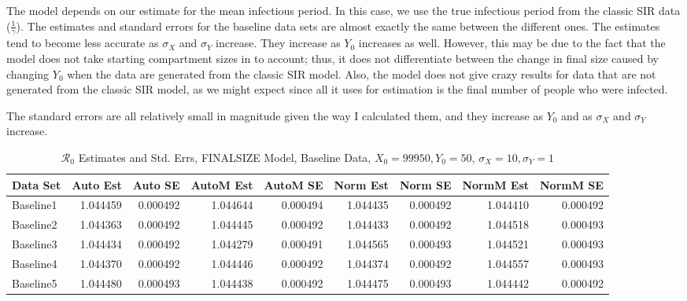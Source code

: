 \documentclass[12pt]{article}
\newcommand{\rr}{\ensuremath{\mathcal{R}_0}}
\begin{document}
The model depends on our estimate for the mean infectious period. In this case, we use the true infectious period from the classic SIR data ($\frac{1}{\gamma}$). The estimates and standard errors for the baseline data sets are almost exactly the same between the different ones. The estimates tend to become less accurate as $\sigma_X$ and $\sigma_Y$ increase. They increase as $Y_0$ increases as well. However, this may be due to the fact that the model does not take starting compartment sizes in to account; thus, it does not differentiate between the change in final size caused by changing $Y_0$ when the data are generated from the classic SIR model. Also, the model does not give crazy results for data that are not generated from the classic SIR model, as we might expect since all it uses for estimation is the final number of people who were infected.

The standard errors are all relatively small in magnitude given the way I calculated them, and they increase as $Y_0$ and as $\sigma_X$ and $\sigma_Y$ increase.

\begin{table}[H]
	
	\caption{$\rr$ Estimates and Std. Errs, FINALSIZE Model, 
		Baseline Data, $X_0 = 99950, Y_0 = 50$, 
		$\sigma_X = 10, \sigma_Y = 1$}
	\begin{footnotesize}
		\hskip -1cm
		\begin{tabular}{l|r|r|r|r|r|r|r|r}
			\hline
			Data Set & Auto Est & Auto SE & AutoM Est & AutoM SE & Norm Est & Norm SE & NormM Est & NormM SE\\
			\hline
			Baseline1 & 1.044459 & 0.000492 & 1.044644 & 0.000494 & 1.044435 & 0.000492 & 1.044410 & 0.000492\\
			\hline
			Baseline2 & 1.044363 & 0.000492 & 1.044445 & 0.000492 & 1.044433 & 0.000492 & 1.044518 & 0.000493\\
			\hline
			Baseline3 & 1.044434 & 0.000492 & 1.044279 & 0.000491 & 1.044565 & 0.000493 & 1.044521 & 0.000493\\
			\hline
			Baseline4 & 1.044370 & 0.000492 & 1.044446 & 0.000492 & 1.044374 & 0.000492 & 1.044557 & 0.000493\\
			\hline
			Baseline5 & 1.044480 & 0.000493 & 1.044438 & 0.000492 & 1.044475 & 0.000493 & 1.044442 & 0.000492\\
			\hline
		\end{tabular}
	\end{footnotesize}
\end{table}
\end{document}

